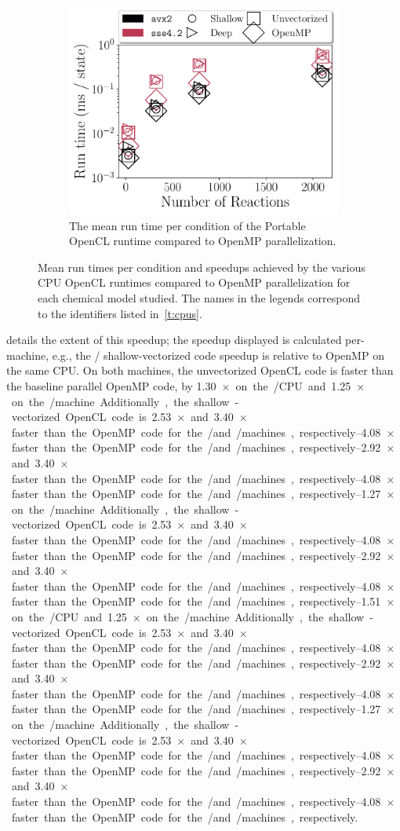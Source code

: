 \documentclass[12pt,number,sort&compress,preprint]{elsarticle}
\begin{document}
\begin{figure}[htbp]
\begin{subfigure}[t]{0.48\linewidth}
      \label{F:intel_source}
  \end{subfigure}
  \\
  \begin{subfigure}[t]{0.48\linewidth}
      \includegraphics[width=\textwidth]{pocl_source_nonorm.pdf}
      \caption{The mean run time per condition of the Portable OpenCL runtime compared to OpenMP parallelization.}
      \label{F:pocl_source}
  \end{subfigure}
 \caption{Mean run times per condition and speedups achieved by the various CPU OpenCL runtimes compared to OpenMP parallelization for each chemical model studied. The names in the legends correspond to the identifiers listed in~\cref{t:cpus}.}
 \label{F:cpu_source}
\end{figure}

 details the extent of this speedup; the speedup displayed is calculated per-machine, e.g., the \avx/ shallow-vectorized code speedup is relative to OpenMP on the same CPU.
On both machines, the unvectorized OpenCL code is faster than the baseline parallel OpenMP code, by \SIrange{1.30}{1.51}{$\times$} on the \avx/ CPU and \SIrange{1.25}{1.27}{$\times$} on the \sse/ machine.
Additionally, the shallow-vectorized OpenCL code is \SIrange{2.53}{2.92}{$\times$} and \SIrange{3.40}{4.08}{$\times$} faster than the OpenMP code for the \sse/ and \avx/ machines, respectively.
\end{document}
